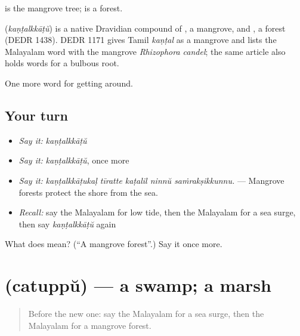  is the mangrove tree;  is a forest.

\begin{cousinweb}
\textbf{} (\emph{kaṇṭalkkāṭŭ}) is a native Dravidian compound of , a mangrove, and , a forest (DEDR 1438). DEDR 1171 gives Tamil \emph{kaṇṭal} as a mangrove and lists the Malayalam word with the mangrove \emph{Rhizophora candel}; the same article also holds words for a bulbous root.
\end{cousinweb}

\begin{grammarlens}[title={What you've built}]
One more word for getting around.
\end{grammarlens}

\subsection*{Your turn}
\begin{itemize}
\raggedright
  \item \emph{Say it:} \emph{kaṇṭalkkāṭŭ}
  \item \emph{Say it:} \emph{kaṇṭalkkāṭŭ}, once more
  \item \emph{Say it:} \emph{kaṇṭalkkāṭukaḷ tīratte kaṭalil ninnŭ saṁrakṣikkunnu.} — Mangrove forests protect the shore from the sea.
  \item \emph{Recall:} say the Malayalam for low tide, then the Malayalam for a sea surge, then say \emph{kaṇṭalkkāṭŭ} again
\end{itemize}

\begin{tcolorbox}[breakable,colback=teal!4,colframe=teal!35!black,title={Before you move on}]
What does  mean? (\textquotedblleft{}A mangrove forest\textquotedblright{}.) Say it once more.
\end{tcolorbox}
\section[\texorpdfstring{\ml{ചതുപ്പ്} (catuppŭ)}{ചതുപ്പ് (catuppŭ)}]{ (catuppŭ) — a swamp; a marsh}

\label{lesson:ML-C498-catuppu}



\begin{quote}
Before the new one: say the Malayalam for a sea surge, then the Malayalam for a mangrove forest.
\end{quote}

